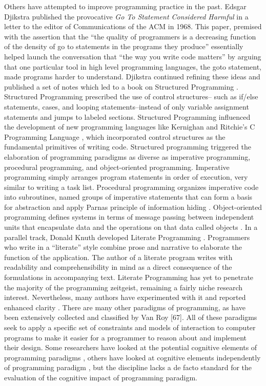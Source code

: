 Others have attempted to improve programming practice in the past. Edsgar Djikstra published the provocative \textit{Go To Statement Considered Harmful} \cite{Dijkstra1968} in a letter to the editor of Communications of the ACM in 1968. This paper, premised with the assertion that the ``the quality of programmers is a decreasing function of the density of go to statements in the programs they produce'' essentially helped launch the conversation that “the way you write code matters” by arguing that one particular tool in high level programming languages, the goto statement, made programs harder to understand.  Djikstra continued refining these ideas and published a set of notes which led to a book on Structured Programming \cite{Dijkstra1972}.  Structured Programming prescribed the use of control structures-- such as if/else statements, cases, and looping statements--instead of only variable assignment statements and jumps to labeled sections.  Structured Programming influenced the development of new programming languages like Kernighan and Ritchie’s C Programming Language \cite{Kerninghan1988}, which incorporated control structures as the fundamental primitives of writing code. Structured programming triggered the elaboration of programming paradigms as diverse as imperative programming, procedural programming, and object-oriented programming. Imperative programming simply arranges program statements in order of execution, very similar to writing a task list. Procedural programming organizes imperative code into subroutines, named groups of imperative statements that can form a basis for abstraction and apply Parnas principle of information hiding \cite{Parnas1972}. Object-oriented programming defines systems in terms of message passing between independent units that encapsulate data and the operations on that data called objects \cite{Kay1993}. In a parallel track, Donald Knuth developed Literate Programming \cite{Knuth1992,Knuth1984}. Programmers who write in a “literate” style combine prose and narrative to elaborate the function of the application. The author of a literate program writes with readability and comprehensibility in mind as a direct consequence of the formulations in accompanying text. Literate Programming has yet to penetrate the majority of the programming zeitgeist, remaining a fairly niche research interest. Nevertheless, many authors have experimented with it and reported enhanced clarity \cite{Ramsey1994}. There are many other paradigms of programming, as have been extensively collected and classified by Van Roy [67]. All of these paradigms seek to apply a specific set of constraints and models of interaction to computer programs to make it easier for a programmer to reason about and implement their design. Some researchers have looked at the potential cognitive elements of programming paradigms \cite{White2005,Kim1992.Rosson1990}, others have looked at cognitive elements independently of programming paradigm \cite{Douce2008}, but the discipline lacks a de facto standard for the evaluation of the cognitive impact of programming paradigm.


